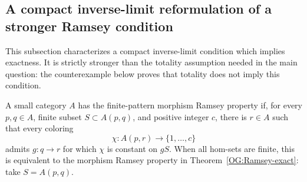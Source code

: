 \subsection{A compact inverse-limit reformulation of a stronger Ramsey condition}

This subsection characterizes a compact inverse-limit condition
which implies exactness. It is strictly stronger than the totality
assumption needed in the main question: the counterexample below
proves that totality does not imply this condition.

\begin{definition}\label{CD:FPR}
A small category $A$ has the finite-pattern morphism Ramsey property if,
for every $p,q\in A$, finite subset $S\subset A(p,q)$, and positive
integer $c$, there is $r\in A$ such that every coloring
\[
 \chi:A(p,r)\longrightarrow\{1,\ldots,c\}
\]
admits $g:q\to r$ for which $\chi$ is constant on $gS$.
When all hom-sets are finite, this is equivalent to the morphism Ramsey
property in Theorem~\ref{OG:Ramsey-exact}: take $S=A(p,q)$.
\end{definition}

